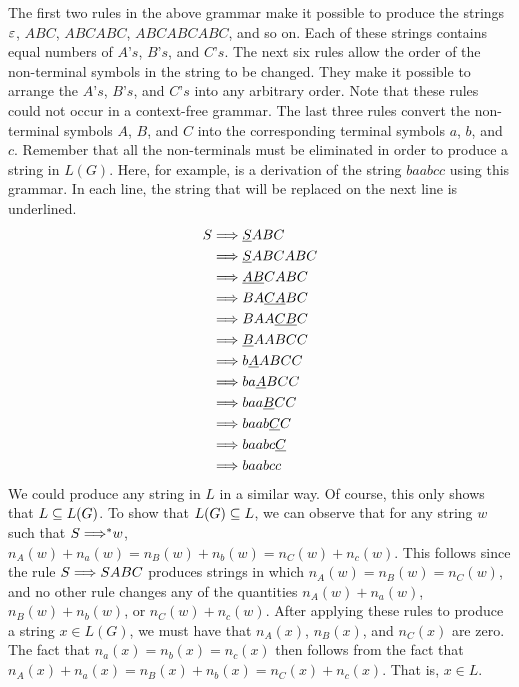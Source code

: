 The first two rules in the above grammar make it possible to produce the strings
$\varepsilon$, $ABC$, $ABCABC$, $ABCABCABC$, and so on.  Each of these strings
contains equal numbers of $A\text{'}s$, $B\text{'}s$, and $C\text{'}s$.
The next six rules allow the order of the non-terminal symbols in the string
to be changed.  They make it possible to arrange the $A\text{'}s$, $B\text{'}s$,
and $C\text{'}s$ into any arbitrary order.  Note that these rules could not occur
in a context-free grammar.  The last three rules convert the non-terminal symbols
$A$, $B$, and $C$ into the corresponding terminal symbols $a$, $b$, and $c$.
Remember that all the non-terminals must be eliminated in order to produce
a string in $L(G)$.  Here, for example, is a derivation of the string
$baabcc$ using this grammar.  In each line, the string that will be replaced
on the next line is underlined.
\begin{align*}
   S&\Longrightarrow \underline{S}ABC\\
    &\Longrightarrow \underline{S}ABCABC\\
    &\Longrightarrow \underline{AB}CABC\\
    &\Longrightarrow BA\underline{CA}BC\\
    &\Longrightarrow BAA\underline{CB}C\\
    &\Longrightarrow \underline{B}AABCC\\
    &\Longrightarrow b\underline{A}ABCC\\
    &\Longrightarrow ba\underline{A}BCC\\
    &\Longrightarrow baa\underline{B}CC\\
    &\Longrightarrow baab\underline{C}C\\
    &\Longrightarrow baabc\underline{C}\\
    &\Longrightarrow baabcc
\end{align*}
We could produce any string in $L$ in a similar way.  Of course,
this only shows that $L\subseteq L(G)$.  To show that $L(G)\subseteq L$,
we can observe that for any string $w$ such that $S\;{\Longrightarrow}^* w$,
$n_A(w)+n_a(w) = n_B(w)+n_b(w) = n_C(w)+n_c(w)$.  This follows since the
rule $S\Longrightarrow SABC$ produces strings in which $n_A(w)=n_B(w)=n_C(w)$,
and no other rule changes any of the quantities
$n_A(w)+n_a(w)$, $n_B(w)+n_b(w)$, or $n_C(w)+n_c(w)$.
After applying these rules to produce a string $x\in L(G)$, we must
have that $n_A(x)$, $n_B(x)$, and $n_C(x)$ are zero.  The fact that
$n_a(x)=n_b(x)=n_c(x)$ then follows from the fact that
$n_A(x)+n_a(x) = n_B(x)+n_b(x) = n_C(x)+n_c(x)$.  That is, $x\in L$.
\medskip

